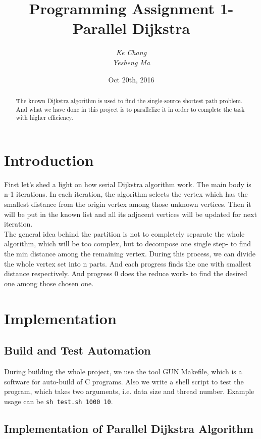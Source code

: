 \documentclass{article}
\begin{document}
\title{Programming Assignment 1- Parallel Dijkstra}
\author{\textit{Ke Chang}\\\textit{Yesheng Ma}}
\date{Oct 20th, 2016}
\maketitle


\begin{abstract}
	The known Dijkstra algorithm is used to find the single-source shortest path problem. And what we have done in this project is to parallelize it in order to complete the task with higher efficiency.
\end{abstract}


\section{Introduction}
First let's shed a light on how serial Dijkstra algorithm work. The main body is n-1 iterations. In each iteration, the algorithm selects the vertex which has the smallest distance from the origin vertex among those unknown vertices. Then it will be put in the known list and all its adjacent vertices will be updated for next iteration.\\
The general idea behind the partition is not to completely separate the whole algorithm, which will be too complex, but to decompose one single step- to find the min distance among the remaining vertex. During this process, we can divide the whole vertex set into n parts. And each progress finds the one with smallest distance respectively. And progress 0 does the reduce work- to find the desired one among those chosen one.  

\section{Implementation}
\subsection{Build and Test Automation}
During building the whole project, we use the tool GUN Makefile, which is a software for auto-build of C programs. Also we write a shell script to test the program, which takes two arguments, i.e. data size and thread number. Example usage can be \verb|sh test.sh 1000 10|.
\subsection{Implementation of Parallel Dijkstra Algorithm}
\end{document}

